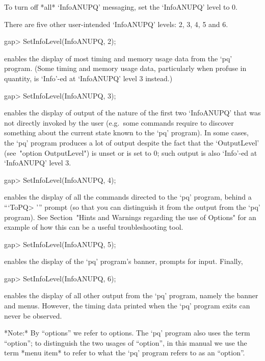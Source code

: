To turn off *all* `InfoANUPQ' messaging, set the `InfoANUPQ' level to 0.

There are five other user-intended `InfoANUPQ' levels: 2, 3, 4, 5 and 6.

\beginexample
gap> SetInfoLevel(InfoANUPQ, 2);
\endexample

enables the display of most timing and memory usage data  from  the  `pq'
program. (Some timing and memory usage data, particularly when profuse in
quantity, is `Info'-ed at `InfoANUPQ' level 3 instead.)

\beginexample
gap> SetInfoLevel(InfoANUPQ, 3);
\endexample

enables the display of output of the nature of the first two  `InfoANUPQ'
that was not directly invoked by the  user  (e.g.~some  commands  require
{\GAP} to discover something about the current state known  to  the  `pq'
program). In some cases, the  `pq'  program  produces  a  lot  of  output
despite the fact that the  `OutputLevel'  (see~"option  OutputLevel")  is
unset or is set to 0; such output is also `Info'-ed at `InfoANUPQ'
level 3.

\beginexample
gap> SetInfoLevel(InfoANUPQ, 4);
\endexample

enables the display of all the commands  directed  to  the  `pq'  program,
behind a ```ToPQ> ''' prompt (so that you can  distinguish  it  from  the
output from the `pq' program). See Section~"Hints and Warnings  regarding
the use of  Options"  for  an  example  of  how  this  can  be  a  useful
troubleshooting tool.

\beginexample
gap> SetInfoLevel(InfoANUPQ, 5);
\endexample

enables the display of the  `pq'  program's  banner,  prompts  for  input.
Finally,

\beginexample
gap> SetInfoLevel(InfoANUPQ, 6);
\endexample

enables the display of all other output from the `pq' program, namely  the
banner and menus. However, the timing data printed when the  `pq'  program
exits can never be observed.


*Note:*
By ``options'' we refer to {\GAP} options. The `pq' program also uses  the
term ``option''; to distinguish the two usages  of  ``option'',  in  this
manual we use the term *menu item* to  refer  to  what  the  `pq'  program
refers to as an ``option''.

